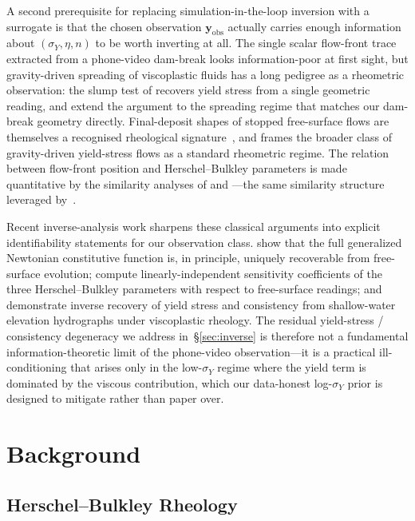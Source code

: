 A second prerequisite for replacing simulation-in-the-loop inversion
with a surrogate is that the chosen observation $\mathbf{y}_{\mathrm{obs}}$
actually carries enough information about
$(\sigma_Y,\eta,n)$ to be worth inverting at all. The single scalar
flow-front trace extracted from a phone-video dam-break looks
information-poor at first sight, but gravity-driven spreading of
viscoplastic fluids has a long pedigree as a rheometric observation:
the slump test of \citet{pashias1996fifty} recovers yield stress
from a single geometric reading, and \citet{roussel2005fiftycent}
extend the argument to the spreading regime that matches our
dam-break geometry directly. Final-deposit shapes of stopped
free-surface flows are themselves a recognised rheological
signature~\cite{coussot1996rheological}, and
\citet{ancey2007plasticity} frames the broader class of
gravity-driven yield-stress flows as a standard rheometric regime.
The relation between flow-front position and
Herschel--Bulkley parameters is made quantitative by the similarity
analyses of \citet{liumei1989slow} and
\citet{balmforth2007two}---the same similarity structure leveraged
by~\citet{hamamichi2023nonnewtonian}.

Recent inverse-analysis work sharpens these classical arguments into
explicit identifiability statements for our observation class.
\citet{martinpritchard2022inferring} show that the full generalized
Newtonian constitutive function is, in principle, uniquely
recoverable from free-surface evolution;
\citet{ahmadi2022identification} compute linearly-independent
sensitivity coefficients of the three Herschel--Bulkley parameters
with respect to free-surface readings; and
\citet{muchiri2024identification} demonstrate inverse recovery of
yield stress and consistency from shallow-water elevation
hydrographs under viscoplastic rheology. The residual
yield-stress / consistency degeneracy we address in~\S\ref{sec:inverse}
is therefore not a fundamental information-theoretic limit of the
phone-video observation---it is a practical ill-conditioning that
arises only in the low-$\sigma_Y$ regime where the yield term is
dominated by the viscous contribution, which our data-honest
log-$\sigma_Y$ prior is designed to mitigate rather than paper over.


\section{Background}

\subsection{Herschel--Bulkley Rheology}

